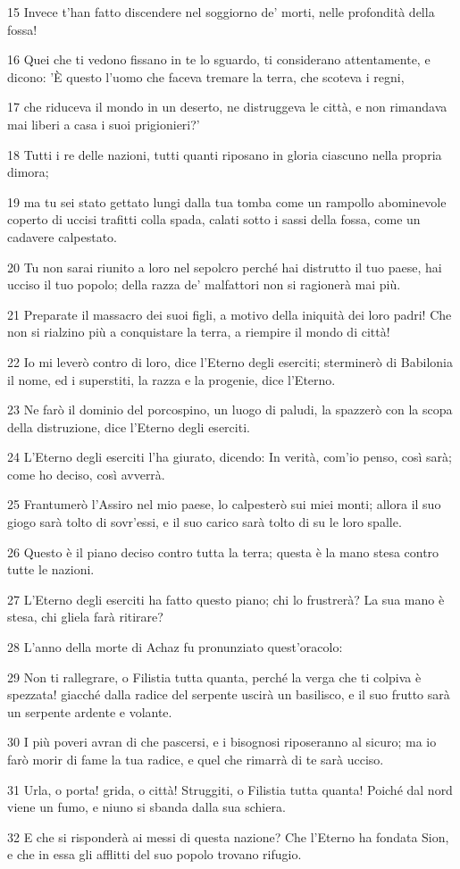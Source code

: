 \par 15 Invece t'han fatto discendere nel soggiorno de' morti, nelle profondità della fossa!
\par 16 Quei che ti vedono fissano in te lo sguardo, ti considerano attentamente, e dicono: 'È questo l'uomo che faceva tremare la terra, che scoteva i regni,
\par 17 che riduceva il mondo in un deserto, ne distruggeva le città, e non rimandava mai liberi a casa i suoi prigionieri?'
\par 18 Tutti i re delle nazioni, tutti quanti riposano in gloria ciascuno nella propria dimora;
\par 19 ma tu sei stato gettato lungi dalla tua tomba come un rampollo abominevole coperto di uccisi trafitti colla spada, calati sotto i sassi della fossa, come un cadavere calpestato.
\par 20 Tu non sarai riunito a loro nel sepolcro perché hai distrutto il tuo paese, hai ucciso il tuo popolo; della razza de' malfattori non si ragionerà mai più.
\par 21 Preparate il massacro dei suoi figli, a motivo della iniquità dei loro padri! Che non si rialzino più a conquistare la terra, a riempire il mondo di città!
\par 22 Io mi leverò contro di loro, dice l'Eterno degli eserciti; sterminerò di Babilonia il nome, ed i superstiti, la razza e la progenie, dice l'Eterno.
\par 23 Ne farò il dominio del porcospino, un luogo di paludi, la spazzerò con la scopa della distruzione, dice l'Eterno degli eserciti.
\par 24 L'Eterno degli eserciti l'ha giurato, dicendo: In verità, com'io penso, così sarà; come ho deciso, così avverrà.
\par 25 Frantumerò l'Assiro nel mio paese, lo calpesterò sui miei monti; allora il suo giogo sarà tolto di sovr'essi, e il suo carico sarà tolto di su le loro spalle.
\par 26 Questo è il piano deciso contro tutta la terra; questa è la mano stesa contro tutte le nazioni.
\par 27 L'Eterno degli eserciti ha fatto questo piano; chi lo frustrerà? La sua mano è stesa, chi gliela farà ritirare?
\par 28 L'anno della morte di Achaz fu pronunziato quest'oracolo:
\par 29 Non ti rallegrare, o Filistia tutta quanta, perché la verga che ti colpiva è spezzata! giacché dalla radice del serpente uscirà un basilisco, e il suo frutto sarà un serpente ardente e volante.
\par 30 I più poveri avran di che pascersi, e i bisognosi riposeranno al sicuro; ma io farò morir di fame la tua radice, e quel che rimarrà di te sarà ucciso.
\par 31 Urla, o porta! grida, o città! Struggiti, o Filistia tutta quanta! Poiché dal nord viene un fumo, e niuno si sbanda dalla sua schiera.
\par 32 E che si risponderà ai messi di questa nazione? Che l'Eterno ha fondata Sion, e che in essa gli afflitti del suo popolo trovano rifugio.

